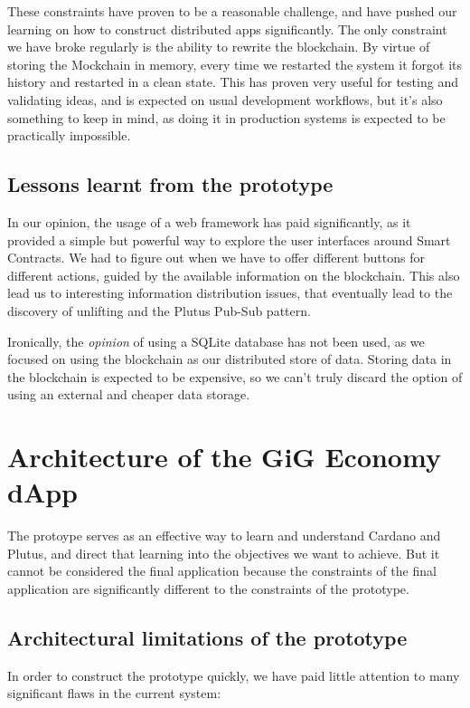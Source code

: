 \documentclass{article}
\begin{document}
These constraints have proven to be a reasonable challenge, and have pushed our learning on how to construct distributed apps significantly. The only constraint we have broke regularly is the ability to rewrite the blockchain. By virtue of storing the Mockchain in memory, every time we restarted the system it forgot its history and restarted in a clean state. This has proven very useful for testing and validating ideas, and is expected on usual development workflows, but it's also something to keep in mind, as doing it in production systems is expected to be practically impossible.

\subsection{Lessons learnt from the prototype}
In our opinion, the usage of a web framework has paid significantly, as it provided a simple but powerful way to explore the user interfaces around Smart Contracts. We had to figure out when we have to offer different buttons for different actions, guided by the available information on the blockchain. This also lead us to interesting information distribution issues, that eventually lead to the discovery of unlifting and the Plutus Pub-Sub pattern\cite{pub-sub-paper}.

Ironically, the \emph{opinion} of using a SQLite database has not been used, as we focused on using the blockchain as our distributed store of data. Storing data in the blockchain is expected to be expensive\cite{transaction-fees}, so we can't truly discard the option of using an external and cheaper data storage.


\section{Architecture of the GiG Economy dApp}
The protoype serves as an effective way to learn and understand Cardano and Plutus, and direct that learning into the objectives we want to achieve. But it cannot be considered the final application because the constraints of the final application are significantly different to the constraints of the prototype.

\subsection{Architectural limitations of the prototype}

In order to construct the prototype quickly, we have paid little attention to many significant flaws in the current system:
\end{document}

